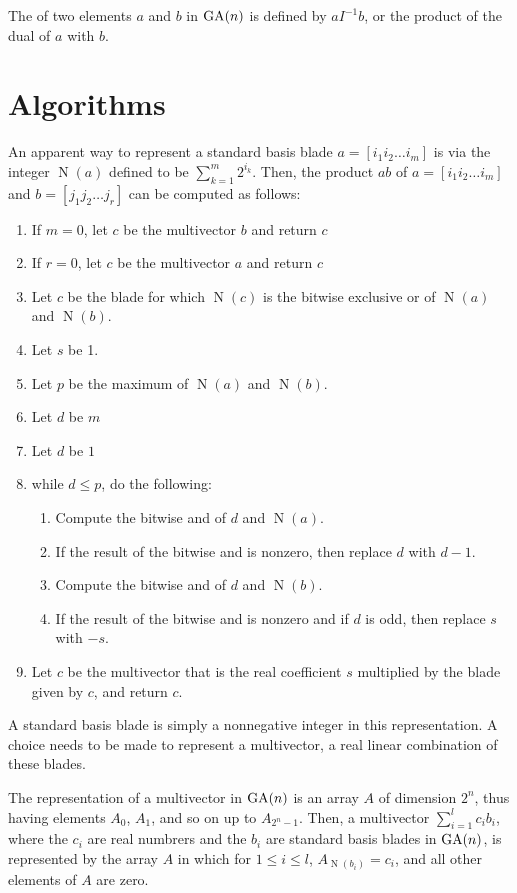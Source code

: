 \documentclass{amsproc}
\theoremstyle{definition}
\theoremstyle{remark}
\numberwithin{equation}{section}
\begin{document}
The  of two elements $a$ and $b$ in $\mathop{\mathrm{GA}}(n)$ is defined by
$aI^{-1}b$, or the product of the dual of $a$ with $b$.

\section{Algorithms}
\newcommand{\n}{\ensuremath{\mathop{\mathrm{N}}}} An apparent way to
represent a standard basis blade $a=[i_1i_2\dots{i}_m]$ is via the
integer $\n(a)$ defined to be $\sum_{k=1}^{m}2^{i_k}$.  Then, the
product $ab$ of $a=[i_1i_2\dots{i}_m]$ and $b=[j_1j_2\dots{j}_r]$
can be computed as follows:

\begin{enumerate}
\item If $m=0$, let $c$ be the multivector $b$ and return $c$
\item If $r=0$, let $c$ be the multivector $a$ and return $c$
\item Let $c$ be the blade for which $\n(c)$ is the bitwise exclusive
  or of $\n(a)$ and $\n(b)$.
\item Let $s$ be 1.
\item Let $p$ be the maximum of $\n(a)$ and $\n(b)$.
\item Let $d$ be $m$
\item Let $d$ be $1$
\item while $d\le{p}$, do the following:
  \begin{enumerate}
  \item Compute the bitwise and of $d$ and $\n(a)$.
  \item If the result of the bitwise and is nonzero, then replace $d$ with $d-1$.
  \item Compute the bitwise and of $d$ and $\n(b)$.
  \item If the result of the bitwise and is nonzero and if $d$ is odd,
    then replace $s$ with $-s$.
  \end{enumerate}
\item Let $c$ be the multivector that is the real coefficient $s$
  multiplied by the blade given by $c$, and return $c$.
\end{enumerate}

A standard basis blade is simply a nonnegative integer in this
representation.  A choice needs to be made to represent a multivector,
a real linear combination of these blades.

The  representation of a multivector in $\mathop{\mathrm{GA}}(n)$ is an
array $A$ of dimension $2^n$, thus having elements $A_0$, $A_1$, and
so on up to $A_{2^n-1}$.  Then, a multivector $\sum_{i=1}^{l}c_ib_i$,
where the $c_i$ are real numbrers and the $b_i$ are standard basis
blades in $\mathop{\mathrm{GA}}(n)$, is represented by the array $A$ in which for
$1\le{i}\le{l}$, $A_{\n(b_i)} = c_i$, and all other elements of $A$
are zero.
\end{document}
